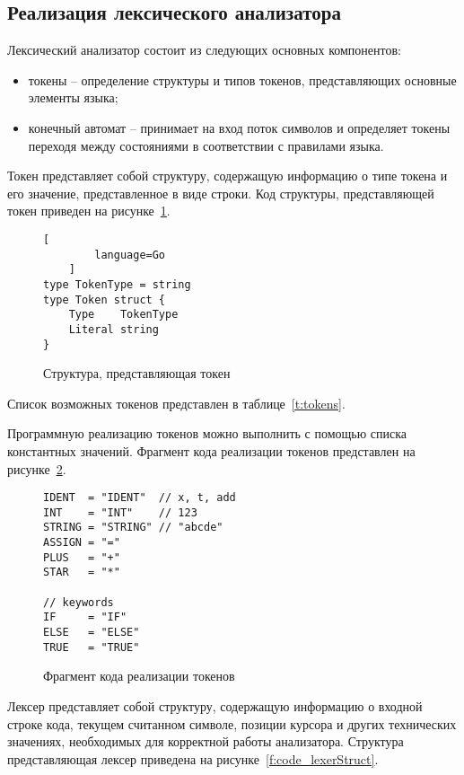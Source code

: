\subsection{Реализация лексического анализатора}

Лексический анализатор состоит из следующих основных компонентов:
\begin{itemize}
    \item токены -- определение структуры и типов токенов, представляющих основные элементы языка;
    \item конечный автомат -- принимает на вход поток символов и определяет токены переходя между состояниями в соответствии с правилами языка.
\end{itemize}

Токен представляет собой структуру, содержащую информацию о типе токена и его значение, представленное в виде строки.
Код структуры, представляющей токен приведен на рисунке~\ref{f:code_tokenStruct}.

\begin{figure}[ht]
	\centering
	\vspace{\toppaddingoffigure}
	\begin{lstlisting}[
        language=Go
    ]
type TokenType = string
type Token struct {
    Type    TokenType
    Literal string
}        
\end{lstlisting}
	\caption{Структура, представляющая токен}
	\label{f:code_tokenStruct}
\end{figure}

Список возможных токенов представлен в таблице~\ref{t:tokens}.

Программную реализацию токенов можно выполнить с помощью списка константных значений.
Фрагмент кода реализации токенов представлен на рисунке~\ref{f:code_tokensFragemnt}.

\begin{figure}[ht]
	\centering
	\vspace{\toppaddingoffigure}
	\begin{lstlisting}
IDENT  = "IDENT"  // x, t, add
INT    = "INT"    // 123
STRING = "STRING" // "abcde"
ASSIGN = "="
PLUS   = "+"
STAR   = "*"

// keywords
IF     = "IF"
ELSE   = "ELSE"
TRUE   = "TRUE"    
\end{lstlisting}
	\caption{Фрагмент кода реализации токенов}
	\label{f:code_tokensFragemnt}
\end{figure}

Лексер представляет собой структуру, содержащую информацию о входной строке кода,
текущем считанном символе, позиции курсора и других технических значениях, необходимых для корректной работы анализатора.
Структура представляющая лексер приведена на рисунке~\ref{f:code_lexerStruct}.

